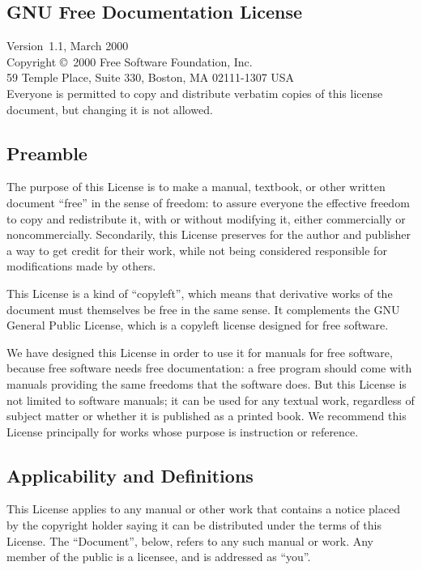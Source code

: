\documentclass[11pt,letter,oneside]{article}
\begin{document}
\begin{albTitlePage}

\section{GNU Free Documentation License}
\label{sec:alb-corp-doc:gnu-free-doc-license}

Version~1.1, March 2000\\[0.25\baselineskip]
Copyright \copyright\ 2000  Free Software Foundation,
Inc.\\[0.25\baselineskip]
59 Temple Place, Suite 330, Boston, MA  02111-1307  USA\\
Everyone is permitted to copy and distribute verbatim copies of this
license document, but changing it is not allowed.


\subsection*{Preamble}

The purpose of this License is to make a manual, textbook, or other
written document ``free'' in the sense of freedom: to assure everyone
the effective freedom to copy and redistribute it, with or without
modifying it, either commercially or noncommercially.  Secondarily, this
License preserves for the author and publisher a way to get credit for
their work, while not being considered responsible for modifications
made by others.

This License is a kind of ``copyleft'', which means that derivative
works of the document must themselves be free in the same sense.  It
complements the GNU General Public License, which is a copyleft license
designed for free software.

We have designed this License in order to use it for manuals for free
software, because free software needs free documentation: a free program
should come with manuals providing the same freedoms that the software
does.  But this License is not limited to software manuals; it can be
used for any textual work, regardless of subject matter or whether it is
published as a printed book.  We recommend this License principally for
works whose purpose is instruction or reference.


\subsection{Applicability and Definitions}
\label{sec:alb-corp-doc:appl-defin}

This License applies to any manual or other work that contains a notice
placed by the copyright holder saying it can be distributed under the
terms of this License.  The ``Document'', below, refers to any such
manual or work.  Any member of the public is a licensee, and is
addressed as ``you''.


\end{albTitlePage}
\end{document}
